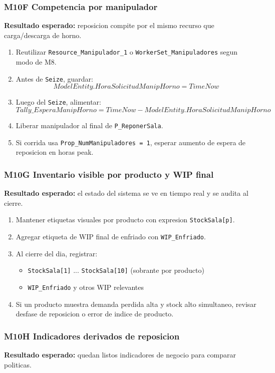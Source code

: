 \documentclass[11pt]{article}
\newcommand{\simio}[1]{\texttt{#1}}
\newcommand{\state}[1]{\texttt{#1}}
\newcommand{\proc}[1]{\texttt{#1}}
\begin{document}
\subsubsection{M10F Competencia por manipulador}
\textbf{Resultado esperado:} reposicion compite por el mismo recurso que carga/descarga de horno.

\begin{enumerate}
  \item Reutilizar \simio{Resource\_Manipulador\_1} o \simio{WorkerSet\_Manipuladores} segun modo de M8.
  \item Antes de \simio{Seize}, guardar:
  \[
  ModelEntity.HoraSolicitudManipHorno = TimeNow
  \]
  \item Luego del \simio{Seize}, alimentar:
  \[
  Tally\_EsperaManipHorno = TimeNow - ModelEntity.HoraSolicitudManipHorno
  \]
  \item Liberar manipulador al final de \proc{P\_ReponerSala}.
  \item Si corrida usa \state{Prop\_NumManipuladores = 1}, esperar aumento de espera de reposicion en horas peak.
\end{enumerate}

\subsubsection{M10G Inventario visible por producto y WIP final}
\textbf{Resultado esperado:} el estado del sistema se ve en tiempo real y se audita al cierre.

\begin{enumerate}
  \item Mantener etiquetas visuales por producto con expresion \state{StockSala[p]}.
  \item Agregar etiqueta de WIP final de enfriado con \state{WIP\_Enfriado}.
  \item Al cierre del dia, registrar:
  \begin{itemize}
    \item \state{StockSala[1]} ... \state{StockSala[10]} (sobrante por producto)
    \item \state{WIP\_Enfriado} y otros WIP relevantes
  \end{itemize}
  \item Si un producto muestra demanda perdida alta y stock alto simultaneo, revisar desfase de reposicion o error de indice de producto.
\end{enumerate}

\subsubsection{M10H Indicadores derivados de reposicion}
\textbf{Resultado esperado:} quedan listos indicadores de negocio para comparar politicas.
\end{document}
